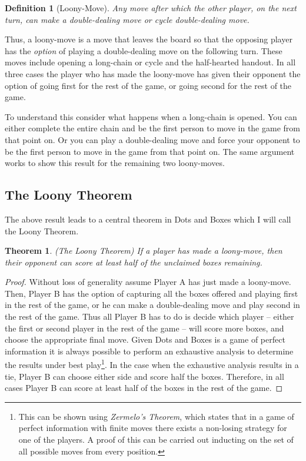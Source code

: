\documentclass[12pt,twoside]{reedthesis}
\newtheorem{mydef}{Definition}
\newtheorem{theorem}{Theorem}
\begin{document}
\begin{mydef}[Loony-Move]
Any move after which the other player, on the next turn, can make a double-dealing move or cycle double-dealing move.
\end{mydef}

Thus, a loony-move is a move that leaves the board so that the opposing player has the \emph{option} of playing a double-dealing move on the following turn.  These moves include opening a long-chain or cycle and the half-hearted handout.  In all three cases the player who has made the loony-move has given their opponent the option of going first for the rest of the game, or going second for the rest of the game.  

To understand this consider what happens when a long-chain is opened.  You can either complete the entire chain and be the first person to move in the game from that point on.  Or you can play a double-dealing move and force your opponent to be the first person to move in the game from that point on.  The same argument works to show this result for the remaining two loony-moves.

\subsection{The Loony Theorem}
The above result leads to a central theorem in Dots and Boxes which I will call the Loony Theorem.

\begin{theorem}
\emph{ (The Loony Theorem) }
If a player has made a loony-move, then their opponent can score at least half of the unclaimed boxes remaining. 
\end{theorem}

\begin{proof}
Without loss of generality assume Player A has just made a loony-move.  Then, Player B has the option of capturing all the boxes offered and playing first in the rest of the game, or he can make a double-dealing move and play second in the rest of the game.  Thus all Player B has to do is decide which player -- either the first or second player in the rest of the game -- will score more boxes, and choose the appropriate final move.  Given Dots and Boxes is a game of perfect information it is always possible to perform an exhaustive analysis to determine the results under best play\footnote[4]{This can be shown using \emph{Zermelo's Theorem}, which states that in a game of perfect information with finite moves there exists a non-losing strategy for one of the players.  A proof of this can be carried out inducting on the set of all possible moves from every position.}.  In the case when the exhaustive analysis results in a tie, Player B can choose either side and score half the boxes.  Therefore, in all cases Player B can score at least half of the boxes in the rest of the game.
\end{proof}
\end{document}
